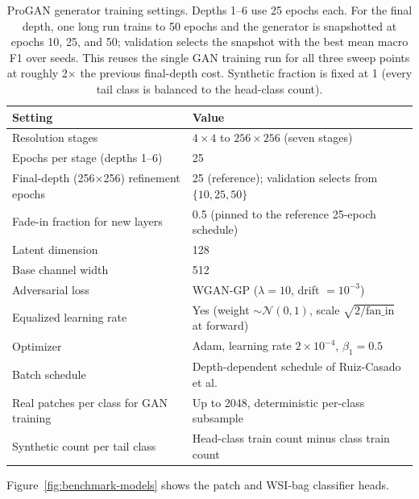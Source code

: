 \documentclass[11pt]{article}
\begin{document}
\begin{table}[ht]
  \centering
  \small
  \begin{tabular}{ll}
    \toprule
    Setting & Value\\
    \midrule
    Resolution stages & $4\times4$ to $256\times256$ (seven stages)\\
    Epochs per stage (depths 1--6) & 25\\
    Final-depth (256$\times$256) refinement epochs & 25 (reference); validation selects from $\{10,25,50\}$\\
    Fade-in fraction for new layers & \num{0.5} (pinned to the reference 25-epoch schedule)\\
    Latent dimension & 128\\
    Base channel width & 512\\
    Adversarial loss & WGAN-GP ($\lambda=10$, drift $=10^{-3}$)\\
    Equalized learning rate & Yes (weight $\sim\mathcal{N}(0,1)$, scale $\sqrt{2/\text{fan\_in}}$ at forward)\\
    Optimizer & Adam, learning rate $2\times10^{-4}$, $\beta_1=\num{0.5}$\\
    Batch schedule & Depth-dependent schedule of Ruiz-Casado et al.\\
    Real patches per class for GAN training & Up to \num{2048}, deterministic per-class subsample\\
    Synthetic count per tail class & Head-class train count minus class train count\\
    \bottomrule
  \end{tabular}
  \caption{ProGAN generator training settings. Depths 1--6 use 25 epochs each. For the final depth, one long run trains to 50 epochs and the generator is snapshotted at epochs 10, 25, and 50; validation selects the snapshot with the best mean macro F1 over seeds. This reuses the single GAN training run for all three sweep points at roughly 2$\times$ the previous final-depth cost. Synthetic fraction is fixed at 1 (every tail class is balanced to the head-class count).}
  \label{tab:progan-generator}
\end{table}

Figure~\ref{fig:benchmark-models} shows the patch and WSI-bag classifier heads.
\end{document}
